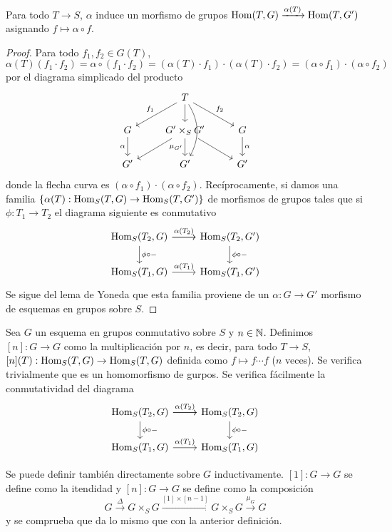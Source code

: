 \documentclass[GA.tex]{subfiles}
\begin{document}
\begin{lemma}
Para todo $T\to S$, $\alpha$ induce un morfismo de grupos $\operatorname{Hom}(T,G)\xrightarrow{\alpha(T)}\operatorname{Hom}(T,G')$ asignando $f\mapsto \alpha\circ f$. 
\end{lemma}
\begin{proof}
Para todo $f_1,f_2\in G(T)$, $\alpha(T)(f_1\cdot f_2)=\alpha\circ(f_1\cdot f_2)=(\alpha(T)\cdot f_1)\cdot(\alpha(T)\cdot f_2)=(\alpha\circ f_1)\cdot(\alpha\circ f_2)$ por el diagrama simplicado del producto
\[
\begin{tikzcd}
 & T \arrow[ld, "f_1"'] \arrow[rd, "f_2"] \arrow[d] \arrow[dd, bend left] &  \\
G \arrow[d, "\alpha"'] & G'\times_S G' \arrow[ld] \arrow[rd] \arrow[d, "\mu_{G'}"'] & G \arrow[d, "\alpha"] \\
G' & G' & G'
\end{tikzcd}
\]
donde la flecha curva es $(\alpha\circ f_1)\cdot (\alpha\circ f_2)$. Recíprocamente, si damos una familia $\{\alpha(T):\operatorname{Hom}_S(T,G)\to\operatorname{Hom}_S(T,G')\}$ de morfismos de grupos tales que si $\phi:T_1\to T_2$ el diagrama siguiente es conmutativo 
\[
\begin{tikzcd}
{\Hom_S(T_2,G)} \arrow[r] \arrow[d, "\phi\circ-"] \arrow[r, "\alpha(T_2)"] & {\Hom_S(T_2,G')} \arrow[d, "\phi\circ-"] \\
{\Hom_S(T_1,G)} \arrow[r, "\alpha(T_1)"] & {\Hom_S(T_1,G')}
\end{tikzcd}
\]
Se sigue del lema de Yoneda que esta familia proviene de un $\alpha:G\to G'$ morfismo de esquemas en grupos sobre $S$.
\end{proof}


\begin{ej}
Sea $G$ un esquema en grupos conmutativo sobre $S$ y $n\in\mathbb{N}$. Definimos $[n]:G\to G$ como la multiplicación por $n$, es decir, para todo $T\to S$, $[n](T):\operatorname{Hom}_S(T,G)\to\operatorname{Hom}_S(T,G)$ definida como $f\mapsto f\cdots f$ ($n$ veces). Se verifica trivialmente que es un homomorfismo de gurpos. Se verifica fácilmente la conmutatividad del diagrama
\[
\begin{tikzcd}
{\Hom_S(T_2,G)} \arrow[r] \arrow[d, "\phi\circ-"] \arrow[r, "\alpha(T_2)"] & {\Hom_S(T_2,G)} \arrow[d, "\phi\circ-"] \\
{\Hom_S(T_1,G)} \arrow[r, "\alpha(T_1)"] & {\Hom_S(T_1,G)}
\end{tikzcd}
\]

Se puede definir también directamente sobre $G$ inductivamente. $[1]:G\to G$ se define como la itendidad y $[n]:G\to G$ se define como la composición 
\[
G\xrightarrow{\Delta}G\times_SG\xrightarrow{[1]\times[n-1]}G\times_S G\xrightarrow{\mu_G}G
\]
y se comprueba que da lo mismo que con la anterior definición. 
\end{ej}
\end{document}
